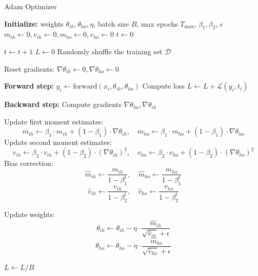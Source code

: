 \begin{algorithm}[H]
\caption{Adam Optimizer}
\begin{algorithmic}[1]
\State \textbf{Initialize:} weights \(\theta_{ih}, \theta_{ho}, \eta\), batch size \(B\), max epochs \(T_{\text{max}}\), \(\beta_1, \beta_2\), \(\epsilon\)
\State \(m_{ih} \gets 0, v_{ih} \gets 0, m_{ho} \gets 0, v_{ho} \gets 0\) 
\State \(t \gets 0\) 

\Repeat
    \State \(t \gets t + 1\)
    \State \(L \gets 0\) 
    \State Randomly shuffle the training set \(\mathcal{D}\)

        \State Reset gradients: \(\nabla \theta_{ih} \gets 0, \nabla \theta_{ho} \gets 0\)

            \State \textbf{Forward step:} \(y_i \gets \text{forward}(x_i, \theta_{ih}, \theta_{ho})\)
            \State Compute loss \(L \gets L + \mathcal{L}(y_i, t_i)\)

            \State \textbf{Backward step:} Compute gradients \(\nabla \theta_{ho}, \nabla \theta_{ih}\)
        \EndFor

        \State Update first moment estimates: 
        \[
        m_{ih} \gets \beta_1 \cdot m_{ih} + (1 - \beta_1) \cdot \nabla \theta_{ih}, \quad m_{ho} \gets \beta_1 \cdot m_{ho} + (1 - \beta_1) \cdot \nabla \theta_{ho}
        \]
        \State Update second moment estimates: 
        \[
        v_{ih} \gets \beta_2 \cdot v_{ih} + (1 - \beta_2) \cdot (\nabla \theta_{ih})^2, \quad v_{ho} \gets \beta_2 \cdot v_{ho} + (1 - \beta_2) \cdot (\nabla \theta_{ho})^2
        \]
        \State Bias correction:
        \[
        \hat{m}_{ih} \gets \frac{m_{ih}}{1 - \beta_1^t}, \quad \hat{m}_{ho} \gets \frac{m_{ho}}{1 - \beta_1^t}
        \]
        \[
        \hat{v}_{ih} \gets \frac{v_{ih}}{1 - \beta_2^t}, \quad \hat{v}_{ho} \gets \frac{v_{ho}}{1 - \beta_2^t}
        \]

        \State Update weights: 
        \[
        \theta_{ih} \gets \theta_{ih} - \eta \cdot \frac{\hat{m}_{ih}}{\sqrt{\hat{v}_{ih}} + \epsilon}
        \]
        \[
        \theta_{ho} \gets \theta_{ho} - \eta \cdot \frac{\hat{m}_{ho}}{\sqrt{\hat{v}_{ho}} + \epsilon}
        \]

        \State \(L \gets L / B\) 
    \EndFor


\end{algorithmic}
\end{algorithm}

